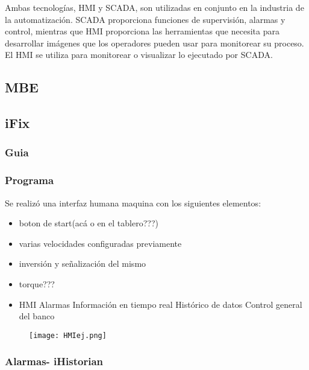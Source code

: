 \begin{tcolorbox}[colback=blue!5!white,colframe=blue!75!black,title=HMI - SCADA]
	Ambas tecnologías, HMI y SCADA, son utilizadas en conjunto en la industria de la automatización. SCADA proporciona funciones de supervisión, alarmas y control, mientras que HMI proporciona las herramientas que necesita para desarrollar imágenes que los operadores pueden usar para monitorear su proceso. El HMI se utiliza para monitorear o visualizar lo ejecutado por SCADA.
\end{tcolorbox}

\subsection{MBE}
\subsection{iFix}
\subsubsection{Guia}
\subsubsection{Programa}


Se realizó una interfaz humana maquina con los siguientes elementos:
\begin{itemize}
	\item boton de start(acá o en el tablero???)
	\item varias velocidades configuradas previamente
	\item inversión y señalización del mismo
	\item torque???
	\item HMI
	      \subitem Alarmas
	      \subitem Información en tiempo real
	      \subitem Histórico de datos
	      \subitem Control general del banco
\end{itemize}
\begin{figure}[htb]
	\centering
	\texttt{[image: HMIej.png]}
\end{figure}

\subsubsection{Alarmas- iHistorian}